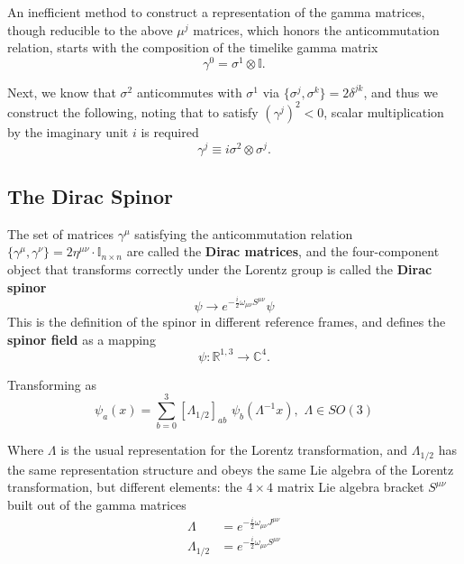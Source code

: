 \noindent An inefficient method to construct a representation of the gamma matrices, though reducible to the above $\mu^j$ matrices, which honors the anticommutation relation, starts with the composition of the timelike gamma matrix
\begin{equation}
\gamma^0 = \sigma^1 \otimes \mathbb{I} .
\end{equation}

\noindent Next, we know that $\sigma^2$ anticommutes with $\sigma^1$ via $\{\sigma^j, \sigma^k \} = 2 \delta^{jk}$, and thus we construct the following, noting that to satisfy $(\gamma^j)^2 <0$, scalar multiplication by the imaginary unit $i$ is required
\begin{equation}
\gamma^j \equiv i \sigma^2 \otimes \sigma^j .
\end{equation}

\subsection*{The Dirac Spinor}

\noindent The set of matrices $\gamma^\mu$ satisfying the anticommutation relation $\{ \gamma^\mu, \gamma^\nu \} = 2 \eta^{\mu\nu} \cdot \mathbb{I}_{n \times n}$ are called the \textbf{Dirac matrices}, and the four-component object that transforms correctly under the Lorentz group is called the \textbf{Dirac spinor}
\begin{equation}
\psi \to e^{-\frac{i}{2} \omega_{\mu\nu} S^{\mu\nu}} \psi
\end{equation}
This is the definition of the spinor in different reference frames, and defines the \textbf{spinor field} as a mapping
\begin{equation}
\psi: \mathbb{R}^{1,3} \to \mathbb{C}^4.
\end{equation}

\noindent Transforming as
\begin{equation}
\psi_a(x) = \sum_{b=0}^3 [ \Lambda_{1/2} ]_{ab} \,\, \psi_b(\Lambda^{-1}x), \,\, \Lambda \in SO(3)
\end{equation}

\noindent Where $\Lambda$ is the usual representation for the Lorentz transformation, and $\Lambda_{1/2}$ has the same representation structure and obeys the same Lie algebra of the Lorentz transformation, but different elements: the $4\times4$ matrix Lie algebra bracket $S^{\mu\nu}$ built out of the gamma matrices
\begin{align}
\Lambda &= e^{-\frac{i}{2} \omega_{\mu\nu} J^{\mu\nu}} \\
\Lambda_{1/2} &= e^{-\frac{i}{2} \omega_{\mu\nu} S^{\mu\nu}}
\end{align}

